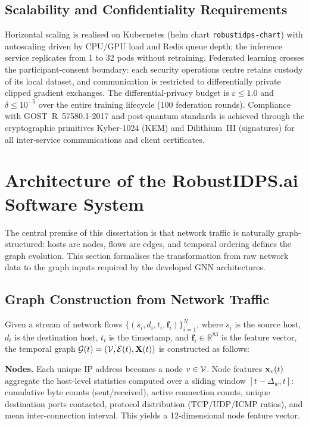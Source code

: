\subsection{Scalability and Confidentiality Requirements}
\label{subsec:req_scalability_privacy}

Horizontal scaling is realised on Kubernetes (helm chart \texttt{robustidps-chart}) with autoscaling driven by CPU/GPU load and Redis queue depth; the inference service replicates from 1 to 32 pods without retraining. Federated learning crosses the participant-consent boundary: each security operations centre retains custody of its local dataset, and communication is restricted to differentially private clipped gradient exchanges. The differential-privacy budget is $\varepsilon\leq 1.0$ and $\delta\leq 10^{-5}$ over the entire training lifecycle (100 federation rounds). Compliance with GOST~R~57580.1-2017 and post-quantum standards is achieved through the cryptographic primitives Kyber-1024 (KEM) and Dilithium~III (signatures) for all inter-service communications and client certificates.

\section{Architecture of the RobustIDPS.ai Software System}
\label{sec:data_to_graph}

The central premise of this dissertation is that network traffic is naturally graph-structured: hosts are nodes, flows are edges, and temporal ordering defines the graph evolution. This section formalises the transformation from raw network data to the graph inputs required by the developed GNN architectures.

\subsection{Graph Construction from Network Traffic}

Given a stream of network flows $\{(s_i, d_i, t_i, \mathbf{f}_i)\}_{i=1}^{N}$, where $s_i$ is the source host, $d_i$ is the destination host, $t_i$ is the timestamp, and $\mathbf{f}_i\in\mathbb{R}^{83}$ is the feature vector, the temporal graph $\mathcal{G}(t)=(\mathcal{V},\mathcal{E}(t),\mathbf{X}(t))$ is constructed as follows:

\noindent\textbf{Nodes.} Each unique IP address becomes a node $v\in\mathcal{V}$. Node features $\mathbf{x}_v(t)$ aggregate the host-level statistics computed over a sliding window $[t-\Delta_w, t]$: cumulative byte counts (sent/received), active connection counts, unique destination ports contacted, protocol distribution (TCP/UDP/ICMP ratios), and mean inter-connection interval. This yields a 12-dimensional node feature vector.

